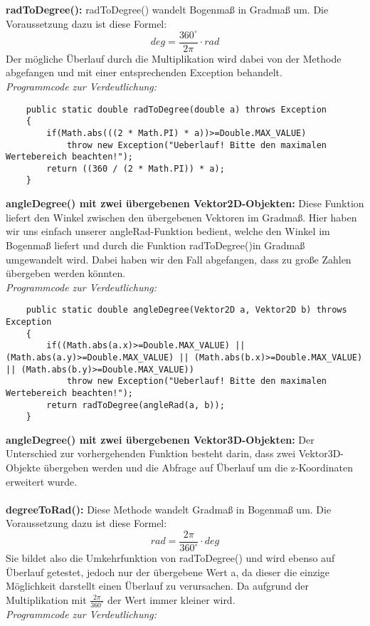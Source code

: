 \documentclass[a4paper,11pt]{scrartcl}
\begin{document}
\textbf{radToDegree():} radToDegree() wandelt Bogenmaß in Gradmaß um. Die Voraussetzung dazu ist diese Formel:
\[ deg = \frac{360 ^\circ }{2\pi} \cdot rad \]
Der mögliche Überlauf durch die Multiplikation wird dabei von der Methode abgefangen und mit einer entsprechenden Exception behandelt.\\
\textit{Programmcode zur Verdeutlichung:}
\begin{lstlisting}
	public static double radToDegree(double a) throws Exception
	{
		if(Math.abs(((2 * Math.PI) * a))>=Double.MAX_VALUE)
			throw new Exception("Ueberlauf! Bitte den maximalen Wertebereich beachten!");
		return ((360 / (2 * Math.PI)) * a);
	}
\end{lstlisting} $\;$ \\
\textbf{angleDegree() mit zwei übergebenen Vektor2D-Objekten:} Diese Funktion liefert den Winkel zwischen den übergebenen Vektoren im Gradmaß. Hier haben wir uns einfach unserer angleRad-Funktion bedient, welche den Winkel im Bogenmaß liefert und durch die Funktion radToDegree()in Gradmaß umgewandelt wird. Dabei haben wir den Fall abgefangen, dass zu große Zahlen übergeben werden könnten.\\
\textit{Programmcode zur Verdeutlichung:}
\begin{lstlisting}
	public static double angleDegree(Vektor2D a, Vektor2D b) throws Exception
	{
		if((Math.abs(a.x)>=Double.MAX_VALUE) || (Math.abs(a.y)>=Double.MAX_VALUE) || (Math.abs(b.x)>=Double.MAX_VALUE) || (Math.abs(b.y)>=Double.MAX_VALUE))
			throw new Exception("Ueberlauf! Bitte den maximalen Wertebereich beachten!");
		return radToDegree(angleRad(a, b));
	}
\end{lstlisting} $\;$ \\
\textbf{angleDegree() mit zwei übergebenen Vektor3D-Objekten:} Der Unterschied zur vorhergehenden Funktion besteht darin, dass zwei Vektor3D-Objekte übergeben werden und die Abfrage auf Überlauf um die z-Koordinaten erweitert wurde.\\
\\
\textbf{degreeToRad():} Diese Methode wandelt Gradmaß in Bogenmaß um. Die Voraussetzung dazu ist diese Formel:
\[ rad = \frac{2\pi}{360 ^\circ} \cdot deg \]
Sie bildet also die Umkehrfunktion von radToDegree() und wird ebenso auf Überlauf getestet, jedoch nur der übergebene Wert a, da dieser die einzige Möglichkeit darstellt einen Überlauf zu verursachen. Da aufgrund der Multiplikation mit $\frac{2\pi}{360 ^\circ}$ der Wert immer kleiner wird.\\
\textit{Programmcode zur Verdeutlichung:}
\end{document}
